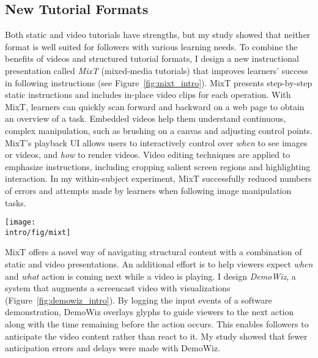 
\subsection{New Tutorial Formats}

Both static and video tutorials have strengths, but my study showed that neither format is well suited for followers with various learning needs.
%
To combine the benefits of videos and structured tutorial formats, I design a new instructional presentation called \emph{MixT} (mixed-media tutorials) that improves learners' success in following instructions (see Figure~\ref{fig:mixt_intro}).
%
MixT presents step-by-step static instructions and includes in-place video clips for each operation.
%
With MixT, learners can quickly scan forward and backward on a web page to obtain an overview of a task. Embedded videos help them understand continuous, complex manipulation, such as brushing on a canvas and adjusting control points.
%
MixT's playback UI allows users to interactively control over \emph{when} to see images or videos, and \emph{how} to render videos.
%
Video editing techniques are applied to emphasize instructions, including cropping salient screen regions and highlighting interaction.
%
In my within-subject experiment, MixT successfully reduced numbers of errors and attempts made by learners when following image manipulation tasks.

\begin{figure*}[t]
  \centering
  \texttt{[image: \\intro/fig/mixt]}
  \caption{MixT generates tutorials that contain static and video information from task demonstrations. Videos are automatically edited and offer different views to highlight the most relevant screen areas for a step. Visualizing mouse movement helps user understand a complex action.}
  \label{fig:mixt_intro}
\end{figure*}


MixT offers a novel way of navigating structural content with a combination of static and video presentations. An additional effort is to help viewers expect \emph{when} and \emph{what} action is coming next while a video is playing. I design \emph{DemoWiz}, a system that augments a screencast video with visualizations (Figure~\ref{fig:demowiz_intro}). By logging the input events of a software demonstration, DemoWiz overlays glyphs to guide viewers to the next action along with the time remaining before the action occurs. This enables followers to anticipate the video content rather than react to it.
%
My study showed that fewer anticipation errors and delays were made with DemoWiz.

